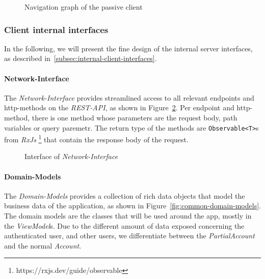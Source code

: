\begin{figure}
    \centering

    \caption{Navigation graph of the passive client}
    \label{fig:passive-navigation}
\end{figure}

\subsubsection{Client internal interfaces}
In the following, we will present the fine design of the internal server interfaces, as described in~\ref{subsec:internal-client-interfaces}.

\paragraph{Network-Interface}\label{par:common-networkinterface}
The \textit{Network-Interface} provides streamlined access to all relevant endpoints and http-methods on the \textit{REST-API}, as shown in Figure~\ref{fig:common-networkinterface}.
Per endpoint and http-method, there is one method whose parameters are the request body, path variables or query paremetr.
The return type of the methods are \texttt{Observable<T>}s from \textit{RxJs} \footnote{https://rxjs.dev/guide/observable} that contain the response body of the request.

\begin{figure}
    \centering

    \caption{Interface of \textit{Network-Interface}}
    \label{fig:common-networkinterface}
\end{figure}

\paragraph{Domain-Models}\label{par:common-domain-models}
The \textit{Domain-Models} provides a collection of rich data objects that model the business data of the application, as shown in Figure~\ref{fig:common-domain-models}.
The domain models are the classes that will be used around the app, mostly in the \textit{ViewModel}s. \newline
Due to the different amount of data exposed concerning the authenticated user, and other users, we differentiate between the \textit{PartialAccount} and the normal \textit{Account}.

